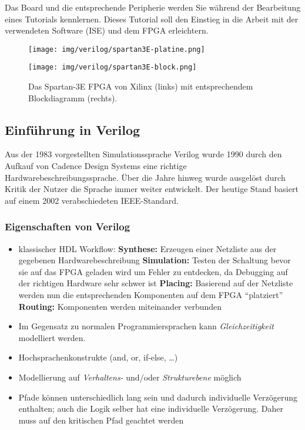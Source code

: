 Das Board und die entsprechende Peripherie werden Sie während der Bearbeitung eines Tutorials kennlernen. Dieses Tutorial soll den Einstieg in die Arbeit mit der verwendeten Software (ISE) und dem FPGA erleichtern.


\begin{figure}[H]
	\begin{minipage}[b]{0.55\textwidth}
		\texttt{[image: img/verilog/spartan3E-platine.png]}
	\end{minipage}
	\begin{minipage}[b]{0.45\textwidth}
		\texttt{[image: img/verilog/spartan3E-block.png]}
	\end{minipage}

	\caption[Das Spartan-3E FPGA von Xilinx (links) mit entsprechendem Blockdiagramm (rechts).]{Das Spartan-3E FPGA von Xilinx\cite{basys2_board} (links) mit entsprechendem Blockdiagramm\cite{basys2_block} (rechts).\footnotemark}
	\label{fig:spartan3}

\end{figure}

\subsection{Einführung in Verilog}
Aus der 1983 vorgestellten Simulationssprache Verilog wurde 1990 durch den Aufkauf von Cadence Design Systems eine richtige Hardwarebeschreibungssprache. Über die Jahre hinweg wurde ausgelöst durch Kritik der Nutzer die Sprache immer weiter entwickelt. Der heutige Stand basiert auf einem 2002 verabschiedeten IEEE-Standard\cite{verilog_year}.

\subsubsection{Eigenschaften von Verilog}
\begin{itemize}
	\item klassischer HDL Workflow:
	\subitem \textbf{Synthese:} Erzeugen einer Netzliste aus der gegebenen Hardwarebeschreibung\cite{hdl_synthesis}
	\subitem \textbf{Simulation:} Testen der Schaltung bevor sie auf das FPGA geladen wird um Fehler zu entdecken, da Debugging auf der richtigen Hardware sehr schwer ist
	\subitem \textbf{Placing:} Basierend auf der Netzliste werden nun die entsprechenden Komponenten auf dem FPGA "`platziert"'
	\subitem \textbf{Routing:} Komponenten werden miteinander verbunden\cite{hdl_routing}
	\item Im Gegensatz zu normalen Programmiersprachen kann
	\textit{Gleichzeitigkeit} modelliert werden.
	\item Hochsprachenkonstrukte (and, or, if-else, \ldots)
	\item Modellierung auf \textit{Verhaltens-} und/oder
	\textit{Strukturebene} möglich
	\item Pfade können unterschiedlich lang sein und dadurch individuelle Verzögerung enthalten; auch die Logik selber hat eine individuelle Verzögerung. Daher muss auf den kritischen Pfad geachtet werden
\end{itemize}

